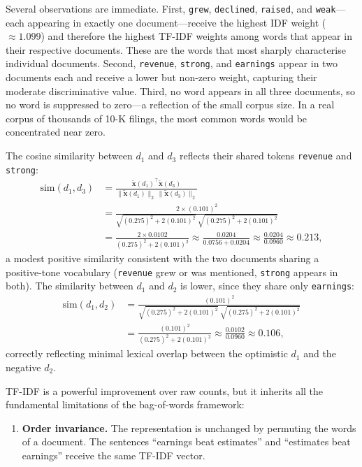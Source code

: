 \begin{deepdive}
\begin{example}
\medskip
Several observations are immediate.  First, \texttt{grew}, \texttt{declined},
\texttt{raised}, and \texttt{weak}---each appearing in exactly one document---receive
the highest IDF weight ($\approx 1.099$) and therefore the highest TF-IDF weights
among words that appear in their respective documents.  These are the words that most
sharply characterise individual documents.  Second, \texttt{revenue}, \texttt{strong},
and \texttt{earnings} appear in two documents each and receive a lower but non-zero
weight, capturing their moderate discriminative value.  Third, no word appears in all
three documents, so no word is suppressed to zero---a reflection of the small corpus
size.  In a real corpus of thousands of 10-K filings, the most common words would be
concentrated near zero.

The cosine similarity between $d_1$ and $d_3$ reflects their shared tokens
\texttt{revenue} and \texttt{strong}:
\begin{align*}
  \mathrm{sim}(d_1, d_3)
  &= \frac{\tilde{\mathbf{x}}(d_1)^\top \tilde{\mathbf{x}}(d_3)}
          {\|\tilde{\mathbf{x}}(d_1)\|_2\, \|\tilde{\mathbf{x}}(d_3)\|_2} \\
  &= \frac{2 \times (0.101)^2}
          {\sqrt{(0.275)^2 + 2(0.101)^2}\;\sqrt{(0.275)^2 + 2(0.101)^2}} \\
  &= \frac{2 \times 0.0102}{(0.275)^2 + 2(0.101)^2}
   \approx \frac{0.0204}{0.0756 + 0.0204}
   \approx \frac{0.0204}{0.0960}
   \approx 0.213,
\end{align*}
a modest positive similarity consistent with the two documents sharing a positive-tone
vocabulary (\texttt{revenue} grew or was mentioned, \texttt{strong} appears in both).
The similarity between $d_1$ and $d_2$ is lower, since they share only \texttt{earnings}:
\[
\begin{aligned}
  \mathrm{sim}(d_1, d_2)
  &= \frac{(0.101)^2}{\sqrt{(0.275)^2 + 2(0.101)^2}\;\sqrt{(0.275)^2 + 2(0.101)^2}} \\
  &= \frac{(0.101)^2}{(0.275)^2 + 2(0.101)^2}
   \approx \frac{0.0102}{0.0960}
   \approx 0.106,
\end{aligned}
\]
correctly reflecting minimal lexical overlap between the optimistic $d_1$ and the
negative $d_2$.
\end{example}

TF-IDF is a powerful improvement over raw counts, but it inherits all the fundamental
limitations of the bag-of-words framework:

\begin{enumerate}
  \item \textbf{Order invariance.}  The representation is unchanged by permuting the
    words of a document.  The sentences ``earnings beat estimates'' and ``estimates beat
    earnings'' receive the same TF-IDF vector.


\end{enumerate}
\end{deepdive}
